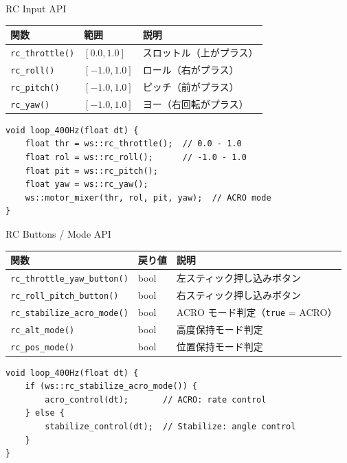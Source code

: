 \begin{frame}[fragile]{RC Input API}
  \vspace{0.3em}
  {\small
  \begin{tabular}{lll}
    \hline
    \textbf{関数} & \textbf{範囲} & \textbf{説明} \\
    \hline
    \texttt{rc\_throttle()} & $[0.0, 1.0]$   & スロットル（上がプラス） \\
    \texttt{rc\_roll()}     & $[-1.0, 1.0]$  & ロール（右がプラス） \\
    \texttt{rc\_pitch()}    & $[-1.0, 1.0]$  & ピッチ（前がプラス） \\
    \texttt{rc\_yaw()}      & $[-1.0, 1.0]$  & ヨー（右回転がプラス） \\
    \hline
  \end{tabular}
  }

  \vspace{0.3em}

  \begin{lstlisting}[style=sfcpp, basicstyle=\ttfamily\scriptsize]
void loop_400Hz(float dt) {
    float thr = ws::rc_throttle();  // 0.0 - 1.0
    float rol = ws::rc_roll();      // -1.0 - 1.0
    float pit = ws::rc_pitch();
    float yaw = ws::rc_yaw();
    ws::motor_mixer(thr, rol, pit, yaw);  // ACRO mode
}
  \end{lstlisting}
\end{frame}

\begin{frame}[fragile]{RC Buttons / Mode API}
  \vspace{0.3em}
  {\small
  \begin{tabular}{lll}
    \hline
    \textbf{関数} & \textbf{戻り値} & \textbf{説明} \\
    \hline
    \texttt{rc\_throttle\_yaw\_button()}  & bool & 左スティック押し込みボタン \\
    \texttt{rc\_roll\_pitch\_button()}    & bool & 右スティック押し込みボタン \\
    \texttt{rc\_stabilize\_acro\_mode()}  & bool & ACRO モード判定（\texttt{true} = ACRO） \\
    \texttt{rc\_alt\_mode()}             & bool & 高度保持モード判定 \\
    \texttt{rc\_pos\_mode()}             & bool & 位置保持モード判定 \\
    \hline
  \end{tabular}
  }

  \vspace{0.3em}

  \begin{lstlisting}[style=sfcpp, basicstyle=\ttfamily\scriptsize]
void loop_400Hz(float dt) {
    if (ws::rc_stabilize_acro_mode()) {
        acro_control(dt);       // ACRO: rate control
    } else {
        stabilize_control(dt);  // Stabilize: angle control
    }
}
  \end{lstlisting}
\end{frame}

